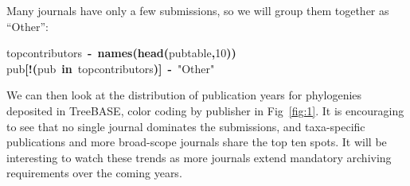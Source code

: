 \documentclass[authoryear, preprint]{elsarticle}
\makeatletter
\newcommand{\hlnumber}[1]{\textcolor[rgb]{0,0,0}{#1}}%
\newcommand{\hlfunctioncall}[1]{\textcolor[rgb]{.5,0,.33}{\textbf{#1}}}%
\newcommand{\hlstring}[1]{\textcolor[rgb]{.6,.6,1}{#1}}%
\newcommand{\hlkeyword}[1]{\textbf{#1}}%
\newcommand{\hlassignement}[1]{\textbf{#1}}%
\newcommand{\hlsymbol}[1]{#1}%
\newcommand{\hlstd}[1]{\textcolor[rgb]{0,0,0}{#1}}%
\newenvironment{kframe}{%
 \def\FrameCommand##1{\hskip\@totalleftmargin \hskip-\fboxsep
 \colorbox{shadecolor}{##1}\hskip-\fboxsep
     \hskip-\linewidth \hskip-\@totalleftmargin \hskip\columnwidth}%
 \MakeFramed {\advance\hsize-\width
   \@totalleftmargin\z@ \linewidth\hsize
   \@setminipage}}%
 {\par\unskip\endMakeFramed}
\newenvironment{knitrout}{}{} %
\makeatother
\begin{document}
Many journals have only a few submissions, so we will group them together as ``Other'':  
\begin{knitrout}
\color{fgcolor}\begin{kframe}
\begin{flushleft}
\ttfamily\noindent
\hlsymbol{top\usebox{\hlnormalsizeboxunderscore}contributors}{\ }\hlassignement{\usebox{\hlnormalsizeboxlessthan}-}{\ }\hlfunctioncall{names}\hlkeyword{(}\hlfunctioncall{head}\hlkeyword{(}\hlsymbol{pub\usebox{\hlnormalsizeboxunderscore}table}\hlkeyword{,}\hlnumber{10}\hlkeyword{)}\hlkeyword{)}\hspace*{\fill}\\
\hlstd{}\hlsymbol{pub}\hlkeyword{[}\hlkeyword{!}\hlkeyword{(}\hlsymbol{pub}{\ }\hlkeyword{\usebox{\hlnormalsizeboxpercent}in\usebox{\hlnormalsizeboxpercent}}{\ }\hlsymbol{top\usebox{\hlnormalsizeboxunderscore}contributors}\hlkeyword{)}\hlkeyword{]}{\ }\hlassignement{\usebox{\hlnormalsizeboxlessthan}-}{\ }\hlstring{"{}Other"{}}\mbox{}
\normalfont
\end{flushleft}
\end{kframe}
\end{knitrout}


We can then look at the distribution of publication years for phylogenies deposited in TreeBASE,
color coding by publisher in Fig~\ref{fig:1}.
It is encouraging to see that no single journal dominates the submissions, 
and taxa-specific publications and more broad-scope journals share the top ten spots. 
It will be interesting to watch these trends as more journals extend mandatory archiving requirements
over the coming years.  
\end{document}
